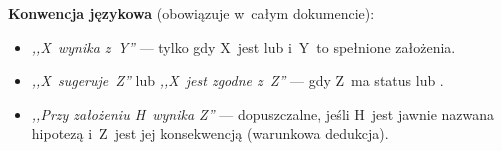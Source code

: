\begin{remark}
\medskip\noindent
\textbf{Konwencja j\k{e}zykowa} (obowi\k{a}zuje w~ca\l{}ym dokumencie):
\begin{itemize}[nosep]
  \item \emph{,,X~wynika z~Y''} --- tylko gdy X~jest
     lub 
    i~Y~to spe\l{}nione za\l{}o\.zenia.
  \item \emph{,,X~sugeruje~Z''} lub \emph{,,X~jest zgodne z~Z''} ---
    gdy Z~ma status  lub .
  \item \emph{,,Przy za\l{}o\.zeniu H~wynika Z''} ---
    dopuszczalne, je\'sli H~jest jawnie nazwana hipotez\k{a}
    i~Z~jest jej konsekwencj\k{a} (warunkowa dedukcja).
\end{itemize}
\end{remark}

